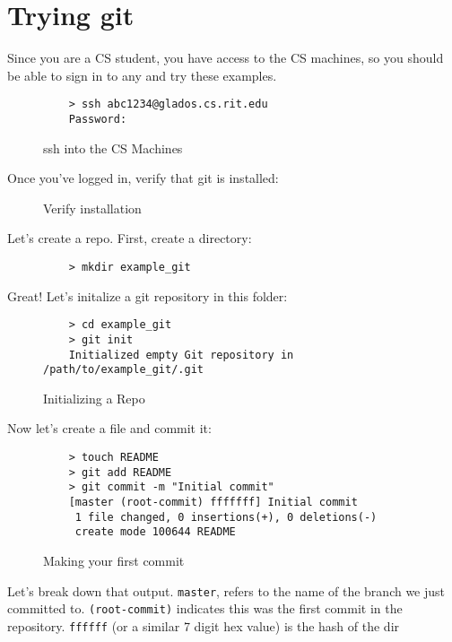 \documentclass[11pt]{report}
\begin{document}
\section{Trying git}
Since you are a CS student,
you have access to the CS machines, so you should be able to sign in to any and
try these examples.

\begin{figure}[H]
  \caption{ssh into the CS Machines}
  \begin{lstlisting}
    > ssh abc1234@glados.cs.rit.edu
    Password:
  \end{lstlisting}
\end{figure}

Once you've logged in, verify that git is installed:

\begin{figure}[H]\end{figure}
\begin{figure}[H]\caption{Verify installation}\end{figure}

Let's create a repo. First, create a directory:
\begin{figure}[H]
  \begin{lstlisting}
    > mkdir example_git
  \end{lstlisting}
\end{figure}

Great! Let's initalize a git repository in this folder:
\begin{figure}[H]
  \caption{Initializing a Repo}
  \begin{lstlisting}
    > cd example_git
    > git init
    Initialized empty Git repository in /path/to/example_git/.git
  \end{lstlisting}
\end{figure}

Now let's create a file and commit it:
\begin{figure}[H]
  \caption{Making your first commit}
  \begin{lstlisting}
    > touch README
    > git add README
    > git commit -m "Initial commit"
    [master (root-commit) fffffff] Initial commit
     1 file changed, 0 insertions(+), 0 deletions(-)
     create mode 100644 README
  \end{lstlisting}
\end{figure}

Let's break down that output. \texttt{master}, refers to the name of the branch
we just committed to. \texttt{(root-commit)} indicates this was the first commit
in the repository. \texttt{ffffff} (or a similar 7 digit hex value) is the
hash of the dir
\end{document}

